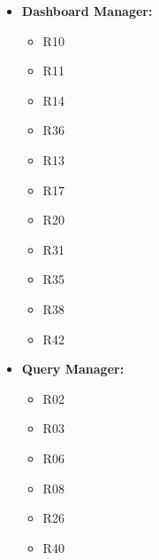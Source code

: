 \begin{itemize}
\begin{itemize}
          \end{itemize}
    \item \textbf{Dashboard Manager:}
          \begin{itemize}
              \item R10
              \item R11
              \item R14
              \item R36
              \item R13
              \item R17
              \item R20
              \item R31
              \item R35
              \item R38
              \item R42
          \end{itemize}
    \item \textbf{Query Manager:}
          \begin{itemize}
              \item R02
              \item R03
              \item R06
              \item R08
              \item R26
              \item R40
          \end{itemize}
\end{itemize}